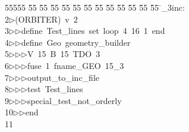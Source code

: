 %
%
\begin{tabbing}
55555 \= 55 \= 55 \= 55 \= 55 \= 55 \= 55 \= 55 \= 55 \= 55 \= 55 \= 55 \= 55 \= \_3inc:\\[0pt]
2\>$\triangleright$\>(ORBITER)\ v\ 2\ \\[0pt]
3\>$\triangleright$\>$\triangleright$\>define\ Test\_lines\ set\ loop\ 4\ 16\ 1\ end\ \\[0pt]
4\>$\triangleright$\>$\triangleright$\>define\ Geo\ geometry\_builder\ \\[0pt]
5\>$\triangleright$\>$\triangleright$\>$\triangleright$\>V\ 15\ B\ 15\ TDO\ 3\ \\[0pt]
6\>$\triangleright$\>$\triangleright$\>$\triangleright$\>fuse\ 1\ fname\_GEO\ 15\_3\ \\[0pt]
7\>$\triangleright$\>$\triangleright$\>$\triangleright$\>output\_to\_inc\_file\ \\[0pt]
8\>$\triangleright$\>$\triangleright$\>$\triangleright$\>test\ Test\_lines\ \\[0pt]
9\>$\triangleright$\>$\triangleright$\>$\triangleright$\>special\_test\_not\_orderly\ \\[0pt]
10\>$\triangleright$\>$\triangleright$\>end\\[0pt]
11\>\end{tabbing}
